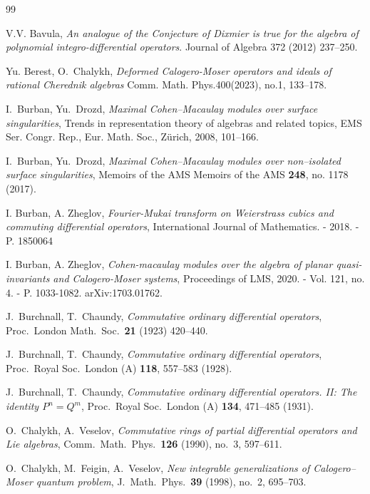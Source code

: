 \documentclass[11pt]{article}
\theoremstyle{definition}
\theoremstyle{plain}
\numberwithin{equation}{section}
\begin{document}
\begin{thebibliography}{99}

 V.V. Bavula, {\it An analogue of the Conjecture of Dixmier is true for the
algebra of polynomial integro-differential operators}. Journal of Algebra 372 (2012) 237–250.

 Yu. Berest, O.~Chalykh, {\it Deformed Calogero-Moser operators and ideals of rational Cherednik algebras} Comm. Math. Phys.400(2023), no.1, 133–178.

 I.~Burban, Yu.~Drozd,
\emph{Maximal Cohen--Macaulay modules over surface singularities},
  Trends in representation theory of algebras and related topics, EMS Ser. Congr. Rep., Eur. Math. Soc.,  Z\"urich,  2008, 101--166.


 I.~Burban, Yu.~Drozd,
\emph{Maximal Cohen--Macaulay modules over non--isolated surface singularities}, Memoirs of the AMS Memoirs of the AMS \textbf{248}, no. 1178 (2017). 


 I. Burban, A. Zheglov, {\em Fourier-Mukai transform on Weierstrass cubics and commuting differential operators}, International Journal of Mathematics. - 2018. - P. 1850064

 I. Burban, A. Zheglov, {\em Cohen-macaulay modules over the algebra of planar quasi-invariants and Calogero-Moser systems}, Proceedings of LMS, 2020. - Vol. 121, no. 4. - P. 1033-1082. arXiv:1703.01762.

 J.~Burchnall, T.~Chaundy, \emph{Commutative ordinary differential operators},
 Proc.~London Math.~Soc.~\textbf{21}  (1923) 420--440.
 
 J.~Burchnall, T.~Chaundy, \emph{Commutative ordinary differential operators},
Proc.~Royal Soc.~London (A) \textbf{118}, 557--583 (1928).

 J.~Burchnall, T.~Chaundy, \emph{Commutative ordinary differential operators. II: The identity $P^n =Q^m$},
Proc.~Royal Soc.~London (A) \textbf{134}, 471--485 (1931).



 O.~Chalykh, A.~Veselov, \emph{Commutative rings of partial differential operators and Lie algebras},  Comm.~Math.~Phys.~\textbf{126} (1990), no.~{3}, 597--611.

 O.~Chalykh, M.~Feigin, A.~Veselov, \emph{New integrable generalizations of Calogero--Moser quantum problem},  J.~Math.~Phys.~\textbf{39} (1998), no.~{2}, 695--703.


\end{thebibliography}
\end{document}
